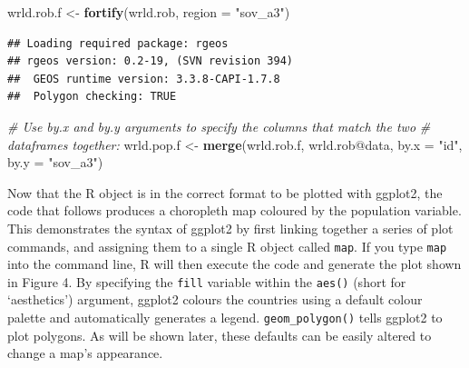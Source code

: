 \documentclass[]{article}
\newenvironment{Shaded}{}{}
\newcommand{\KeywordTok}[1]{\textcolor[rgb]{0.00,0.44,0.13}{\textbf{{#1}}}}
\newcommand{\DataTypeTok}[1]{\textcolor[rgb]{0.56,0.13,0.00}{{#1}}}
\newcommand{\StringTok}[1]{\textcolor[rgb]{0.25,0.44,0.63}{{#1}}}
\newcommand{\CommentTok}[1]{\textcolor[rgb]{0.38,0.63,0.69}{\textit{{#1}}}}
\newcommand{\NormalTok}[1]{{#1}}
\begin{document}
\begin{Shaded}
\begin{Highlighting}[]
\NormalTok{wrld.rob.f <- }\KeywordTok{fortify}\NormalTok{(wrld.rob, }\DataTypeTok{region =} \StringTok{"sov_a3"}\NormalTok{)}
\end{Highlighting}
\end{Shaded}
\begin{verbatim}
## Loading required package: rgeos
## rgeos version: 0.2-19, (SVN revision 394)
##  GEOS runtime version: 3.3.8-CAPI-1.7.8 
##  Polygon checking: TRUE
\end{verbatim}
\begin{Shaded}
\begin{Highlighting}[]

\CommentTok{# Use by.x and by.y arguments to specify the columns that match the two}
\CommentTok{# dataframes together:}
\NormalTok{wrld.pop.f <- }\KeywordTok{merge}\NormalTok{(wrld.rob.f, wrld.rob@data, }\DataTypeTok{by.x =} \StringTok{"id"}\NormalTok{, }\DataTypeTok{by.y =} \StringTok{"sov_a3"}\NormalTok{)}
\end{Highlighting}
\end{Shaded}

Now that the R object is in the correct format to be plotted with ggplot2, the code that follows
 produces a choropleth map coloured by the population variable. This
demonstrates the syntax of ggplot2 by first linking together a series
of plot commands, and assigning them to a single R object called
\texttt{map}. If you type \texttt{map} into the command line, R will
then execute the code and generate the plot shown in Figure 4. By specifying the
\texttt{fill} variable within the \texttt{aes()} (short for
`aesthetics') argument, ggplot2 colours the countries using a default
colour palette and automatically generates a legend.
\texttt{geom\_polygon()} tells ggplot2 to plot polygons. As will be
shown later, these defaults can be easily altered to change
a map's appearance.
\end{document}
